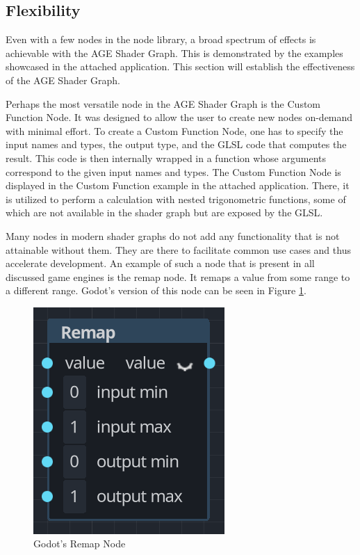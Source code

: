 \documentclass[
  digital,     %
  oneside,     %
  nosansbold,  %
  nocolorbold, %
  lof,         %
  lot,         %
]{fithesis4}
\begin{document}
\subsection{Flexibility}
Even with a few nodes in the node library, a broad spectrum of effects
is achievable with the AGE Shader Graph. This is demonstrated by the examples showcased
in the attached application. This section will establish the effectiveness of
the AGE Shader Graph.

Perhaps the most versatile node in the AGE Shader Graph is the Custom Function Node.
It was designed to allow the user to create
new nodes on-demand with minimal effort. To create a Custom Function Node,
one has to specify the input names and types, the output type,
and the GLSL code that computes the result. This code is then internally wrapped in a function
whose arguments correspond to the given input names and types.
The Custom Function Node is displayed in the Custom Function example in the attached application.
There, it is utilized to perform a calculation with nested trigonometric functions,
some of which are not available in the shader graph but are exposed by the GLSL.

Many nodes in modern shader graphs do not add any functionality that is not
attainable without them. They are there to facilitate common use cases
and thus accelerate development. An example of such a node that is present
in all discussed game engines is the remap node. It remaps a value
from some range to a different range. Godot's version of this node can be seen in Figure \ref{fig:godot-remap-node}.
\begin{figure}[H]
    \centering
    \includegraphics[height=0.3\textwidth]{images/godot_remap_node.png}
    \caption{Godot's Remap Node}
    \label{fig:godot-remap-node}
\end{figure}
\end{document}
